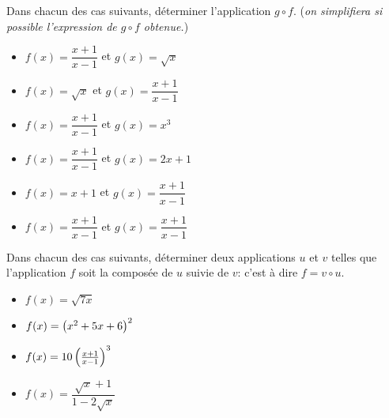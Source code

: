 \begin{exercice}
Dans chacun des cas suivants, déterminer   l'application  $ g\circ f $. (\textit{on simplifiera si possible l'expression de $ g\circ f $ obtenue.})

\begin{itemize}
\item  $ f(x)= \dfrac{x+1}{x-1} $ \; et \; $ g(x)=\sqrt{x} $


\item $ f(x)= \sqrt{x} $ \;  et \; $ g(x)=\dfrac{x+1}{x-1}$

\item  $ f(x)= \dfrac{x+1}{x-1} $  \;et\; $ g(x)=x^{3} $


\item  $ f(x)= \dfrac{x+1}{x-1} $  \;et\; $ g(x)=2x+1 $


\item $ f(x)= x+1 $ \;  et \; $ g(x)=\dfrac{x+1}{x-1}$


\item $ f(x)= \dfrac{x+1}{x-1} $ \; et \;$ g(x)= \dfrac{x+1}{x-1}$


\end{itemize}

\end{exercice}




\begin{exercice}[Décomposition]
 Dans chacun des cas suivants, déterminer deux applications   $  u $  et $ v $  telles que  l'application $ f $  soit la composée de   $  u $  suivie de  $ v $:\; c'est à dire $ f=v\circ u $.

\begin{itemize}
\item  $ f(x)= \sqrt{7x} $ 


\item  $ f(x)= \left(x^{2}+5x+6\right)^{2} $  



\item $ f(x)=10\left( \frac{x+1}{x-1}\right)^{3} $ 



\item $ f(x)= \dfrac{\sqrt{x}+1}{1-2\sqrt{x}} $ 
\end{itemize}

\end{exercice}


